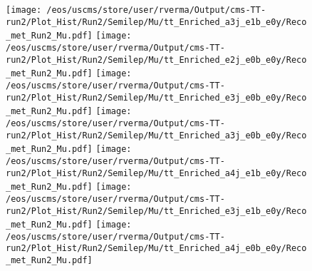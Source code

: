 \begin{figure}
\texttt{[image: /eos/uscms/store/user/rverma/Output/cms-TT-run2/Plot\_Hist/Run2/Semilep/Mu/tt\_Enriched\_a3j\_e1b\_e0y/Reco\_met\_Run2\_Mu.pdf]}
\texttt{[image: /eos/uscms/store/user/rverma/Output/cms-TT-run2/Plot\_Hist/Run2/Semilep/Mu/tt\_Enriched\_e2j\_e0b\_e0y/Reco\_met\_Run2\_Mu.pdf]}
\texttt{[image: /eos/uscms/store/user/rverma/Output/cms-TT-run2/Plot\_Hist/Run2/Semilep/Mu/tt\_Enriched\_e3j\_e0b\_e0y/Reco\_met\_Run2\_Mu.pdf]}
\texttt{[image: /eos/uscms/store/user/rverma/Output/cms-TT-run2/Plot\_Hist/Run2/Semilep/Mu/tt\_Enriched\_a3j\_e0b\_e0y/Reco\_met\_Run2\_Mu.pdf]}
\texttt{[image: /eos/uscms/store/user/rverma/Output/cms-TT-run2/Plot\_Hist/Run2/Semilep/Mu/tt\_Enriched\_a4j\_e1b\_e0y/Reco\_met\_Run2\_Mu.pdf]}
\texttt{[image: /eos/uscms/store/user/rverma/Output/cms-TT-run2/Plot\_Hist/Run2/Semilep/Mu/tt\_Enriched\_e3j\_e1b\_e0y/Reco\_met\_Run2\_Mu.pdf]}
\texttt{[image: /eos/uscms/store/user/rverma/Output/cms-TT-run2/Plot\_Hist/Run2/Semilep/Mu/tt\_Enriched\_a4j\_e0b\_e0y/Reco\_met\_Run2\_Mu.pdf]}
\end{figure}

